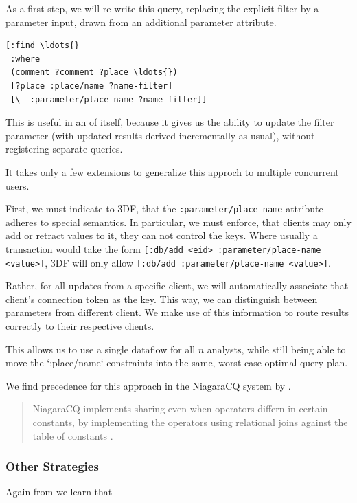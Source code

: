 \documentclass[../catalog.tex]{subfiles}
\begin{document}
As a first step, we will re-write this query, replacing the explicit
filter by a parameter input, drawn from an additional parameter
attribute.

\begin{verbatim}
[:find \ldots{}
 :where
 (comment ?comment ?place \ldots{})
 [?place :place/name ?name-filter]
 [\_ :parameter/place-name ?name-filter]]
\end{verbatim}

This is useful in an of itself, because it gives us the ability to
update the filter parameter (with updated results derived
incrementally as usual), without registering separate queries.

It takes only a few extensions to generalize this approch to multiple
concurrent users.

First, we must indicate to 3DF, that the
\texttt{:parameter/place-name} attribute adheres to special
semantics. In particular, we must enforce, that clients may only add
or retract values to it, they can not control the keys. Where usually
a transaction would take the form \texttt{[:db/add <eid>
    :parameter/place-name <value>]}, 3DF will only allow
\texttt{[:db/add :parameter/place-name <value>]}.

Rather, for all updates from a specific client, we will automatically
associate that client's connection token as the key. This way, we can
distinguish between parameters from different client. We make use of
this information to route results correctly to their respective
clients.

This allows us to use a single dataflow for all $n$ analysts, while
still being able to move the `:place/name` constraints into the same,
worst-case optimal query plan.

We find precedence for this approach in the NiagaraCQ system by
\cite{chen2000niagaracq}.

\begin{quote}
NiagaraCQ implements sharing even when operators differn in certain
constants, by implementing the operators using relational joins
against the table of constants \cite{chen2000niagaracq}.

\cite{hirzel2014catalog}
\end{quote}

\subsubsection{Other Strategies}

Again from \cite{hirzel2014catalog} we learn that
\end{document}
